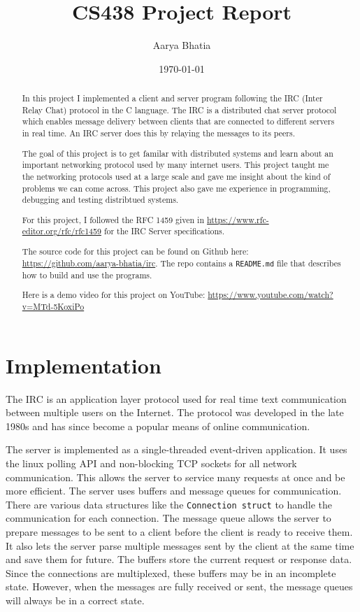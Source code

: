 \documentclass[letterpaper,twocolumn,10pt]{article}
\begin{document}
\title{CS438 Project Report}
\author{Aarya Bhatia}

\date{\today}
\maketitle

\begin{abstract} In this project I implemented a client and server program
	following the IRC (Inter Relay Chat) protocol in the C language. The
	IRC is a distributed chat server protocol which enables message delivery
	between clients that are connected to different servers in real time. An
	IRC server does this by relaying the messages to its peers.

	The goal of this project is to get familar with distributed systems and
	learn about an important networking protocol used by many internet users.
	This project taught me the networking protocols used at a large scale and
	gave me insight about the kind of problems we can come across. This project
	also gave me experience in programming, debugging and testing distribtued
	systems.

	For this project, I followed the RFC 1459 given in
	\url{https://www.rfc-editor.org/rfc/rfc1459} for the IRC Server
	specifications.

	The source code for this project can be found on Github here:
	\url{https://github.com/aarya-bhatia/irc}. The repo contains a \verb|README.md|
	file that describes how to build and use the programs.

	Here is a demo video for this project on YouTube: \url{https://www.youtube.com/watch?v=MTd-5KoxiPo}

\end{abstract}

\section{Implementation}

The IRC is an application layer protocol used for real time text communication
between multiple users on the Internet. The protocol was developed in the late
1980s and has since become a popular means of online communication.

The server is implemented as a single-threaded event-driven application. It
uses the linux polling API and non-blocking TCP sockets for all network
communication. This allows the server to service many requests at once and be
more efficient. The server uses buffers and message queues for communication.
There are various data structures like the \verb|Connection struct| to handle
the communication for each connection. The message queue allows the server to
prepare messages to be sent to a client before the client is ready to receive
them. It also lets the server parse multiple messages sent by the client at the
same time and save them for future. The buffers store the current request or
response data. Since the connections are multiplexed, these buffers may be in
an incomplete state. However, when the messages are fully received or sent, the
message queues will always be in a correct state.
\end{document}
